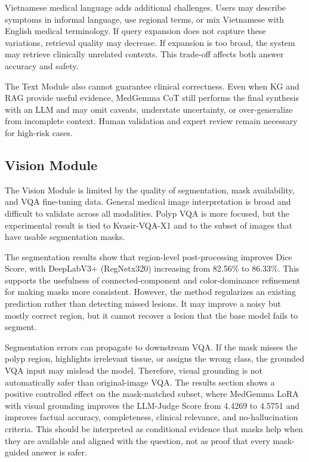 Vietnamese medical language adds additional challenges. Users may describe symptoms in informal language, use regional terms, or mix Vietnamese with English medical terminology. If query expansion does not capture these variations, retrieval quality may decrease. If expansion is too broad, the system may retrieve clinically unrelated contexts. This trade-off affects both answer accuracy and safety.

The Text Module also cannot guarantee clinical correctness. Even when KG and RAG provide useful evidence, MedGemma CoT still performs the final synthesis with an LLM and may omit caveats, understate uncertainty, or over-generalize from incomplete context. Human validation and expert review remain necessary for high-risk cases.

\subsection{Vision Module}

The Vision Module is limited by the quality of segmentation, mask availability, and VQA fine-tuning data. General medical image interpretation is broad and difficult to validate across all modalities. Polyp VQA is more focused, but the experimental result is tied to Kvasir-VQA-X1 and to the subset of images that have usable segmentation masks.

The segmentation results show that region-level post-processing improves Dice Score, with DeepLabV3+ (RegNetx320) increasing from 82.56\% to 86.33\%. This supports the usefulness of connected-component and color-dominance refinement for making masks more consistent. However, the method regularizes an existing prediction rather than detecting missed lesions. It may improve a noisy but mostly correct region, but it cannot recover a lesion that the base model fails to segment.

Segmentation errors can propagate to downstream VQA. If the mask misses the polyp region, highlights irrelevant tissue, or assigns the wrong class, the grounded VQA input may mislead the model. Therefore, visual grounding is not automatically safer than original-image VQA. The results section shows a positive controlled effect on the mask-matched subset, where MedGemma LoRA with visual grounding improves the LLM-Judge Score from 4.4269 to 4.5751 and improves factual accuracy, completeness, clinical relevance, and no-hallucination criteria. This should be interpreted as conditional evidence that masks help when they are available and aligned with the question, not as proof that every mask-guided answer is safer.

